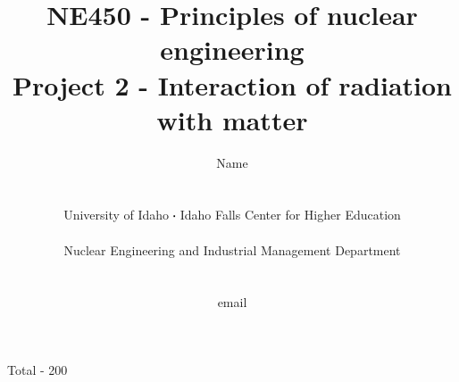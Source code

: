 \documentclass[11pt,a4paper]{article}
\newcommand*\sq{\mathbin{\vcenter{\hbox{\rule{.3ex}{.3ex}}}}} %
\begin{document}
\begin{titlepage}
    \title{
        NE450 - Principles of nuclear engineering\\
        Project 2 - Interaction of radiation with matter\\
    }
    \author{
        Name
        \\ \\ \\
        University of Idaho $\sq$ Idaho Falls Center for Higher Education
        \\ \\
        Nuclear Engineering and Industrial Management Department
        \\ \\ \\
        email 
    }
\clearpage %
\maketitle
\vspace*{\fill}
\begin{flushright}{
        Total - 200
}
\end{flushright}
\thispagestyle{empty} %
\end{titlepage}
\end{document}
